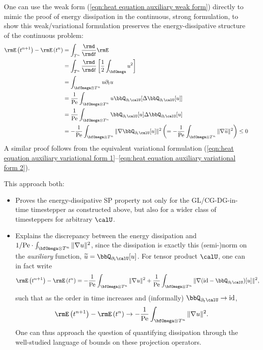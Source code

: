     One can use the weak form (\ref{eqn:heat equation auxiliary weak form}) directly to mimic the proof of energy dissipation in the continuous, strong formulation, to show this weak/variational formulation preserves the energy-dissipative structure of the continuous problem:
    \begin{align}
        \rmE\left(t^{n + 1}\right) - \rmE\left(t^{n}\right)  &=  \int_{T^{n}}\frac{\rmd}{\rmd t}\rmE  \\
        &=  \int_{T^{n}}\frac{\rmd}{\rmd t}\left[\frac{1}{2}\int_{\bfOmega}u^{2}\right]  \\
        &=  \int_{\bfOmega\otimes T^{n}}u\partial_{t}u  \\
        &=  \frac{1}{\rmPe}\int_{\bfOmega\otimes T^{n}}u\bbQ_{\partial_{t}\calU}[\Delta\bbQ_{\partial_{t}\calU}[u]]  \\
        &=  \frac{1}{\rmPe}\int_{\bfOmega\otimes T^{n}}\bbQ_{\partial_{t}\calU}[u]\Delta\bbQ_{\partial_{t}\calU}[u]  \\
        &=  - \frac{1}{\rmPe}\int_{\bfOmega\otimes T^{n}}\|\nabla\bbQ_{\partial_{t}\calU}[u]\|^{2}  \left(=  - \frac{1}{\rmPe}\int_{\bfOmega\otimes T^{n}}\|\nabla\widetilde{u}\|^{2}\right)  \leq  0
    \end{align}
    A similar proof follows from the equivalent variational formulation (\ref{eqn:heat equation auxiliary variational form 1}--\ref{eqn:heat equation auxiliary variational form 2}).

    This approach both:
    \begin{itemize}
        \item  Proves the energy-dissipative SP property not only for the GL/CG-DG-in-time timestepper as constructed above, but also for a wider class of timesteppers for arbitrary $\calU$.
        \item  Explains the discrepancy between the energy dissipation and $1/\rmPe\cdot\int_{\bfOmega\otimes T^{n}}\|\nabla u\|^{2}$, since the dissipation is exactly this (semi-)norm on the \emph{auxiliary} function, $\widetilde{u}  =  \bbQ_{\partial_{t}\calU}[u]$. For tensor product $\calU$, one can in fact write
        \begin{equation}
            \rmE\left(t^{n + 1}\right) - \rmE\left(t^{n}\right)  =  - \frac{1}{\rmPe}\int_{\bfOmega\otimes T^{n}}\|\nabla u\|^{2} + \frac{1}{\rmPe}\int_{\bfOmega\otimes T^{n}}\|\nabla(\id - \bbQ_{\partial_{t}\calU})[u]\|^{2},
        \end{equation}
        such that as the order in time increases and (informally) $\bbQ_{\partial_{t}\calU}  \rightarrow  \id$,
        \begin{equation}
            \rmE\left(t^{n + 1}\right) - \rmE\left(t^{n}\right)  \rightarrow  - \frac{1}{\rmPe}\int_{\bfOmega\otimes T^{n}}\|\nabla u\|^{2}.
        \end{equation}
        One can thus approach the question of quantifying dissipation through the well-studied language of bounds on these projection operators.
    \end{itemize}
    